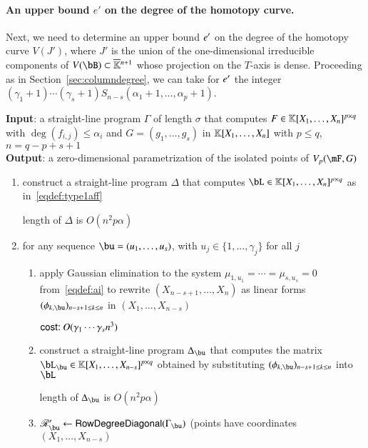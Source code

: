 \documentclass[amsthm]{elsart}
\begin{document}
\paragraph*{An upper bound $e'$ on the degree of the homotopy curve.}
Next, we need to determine an upper bound ${e'}{}$ on the degree of the
homotopy curve $V(J')$, where $J'$ is the union of the one-dimensional
irreducible components of $V(\bB) \subset \KKbar{}^{n+1}$ whose
projection on the $T$-axis is dense. Proceeding as in
Section~\ref{sec:columndegree}, we can take for ${e'}{}$ the integer
$(\gamma_1+1)\cdots(\gamma_s+1) S_{n-s}(\alpha_1
+1,\dots,\alpha_p+1)$.

\medskip



\begin{algorithm}[!t]
\caption{$\mathsf{RowDegree\_simple}(\Gamma)$}
{\bf Input}:  a straight-line program $\Gamma$ of length $\sigma$ that computes
 $F \in \mathbb{K}[X_1, \ldots, X_n]^{p \times q}$ with $\deg(f_{i,j}) \leq \alpha_i$
and $G = (g_1, \ldots, g_s)$ in $\mathbb{K}[X_1, \ldots, X_n]$ with $p \leq q$, $n = q-p+s+1$\\
{\bf Output}: a zero-dimensional parametrization of the isolated points of $\VpFG{p}{\mF}{G}$
\begin{enumerate}
\item construct a straight-line program $\Delta$ that computes
  $\bL \in \KK[X_1,\dots,X_n]^{p \times q}$ as
  in~\eqref{eqdef:type1aff}
  
\hfill length of $\Delta$ is $O(n^2 p \alpha)$
\item for any sequence $\bu=(u_1,\dots,u_s)$, with $u_j \in \{1,\dots,\gamma_j\}$ for all $j$
\begin{enumerate}
\item apply Gaussian elimination to the system 
  $\mu_{1,u_1}=\cdots=\mu_{s,u_s}=0$ from~\eqref{eqdef:ai} to
  rewrite $(X_{n-s+1}, \ldots, X_n)$ as linear forms
  $(\phi_{k,\bu})_{n-s+1 \le k \le n}$ in $(X_1,\dots,X_{n-s})$
  
\hfill  $\text{\sf{cost:~}} O(\gamma_1 \cdots \gamma_s n^3)$

\item construct a straight-line program $\Delta_{\bu}$ that computes the matrix 
  $\bL_\bu  \in \KK[X_1, \dots, X_{n-s}]^{p \times q}$ obtained
  by substituting $(\phi_{k,\bu})_{n-s+1 \le k \le n}$ into $\bL$
  
  \hfill length of $\Delta_{\bu}$ is $O(n^2 p\alpha)$

\item $\scrR'_\bu \gets \mathsf{RowDegreeDiagonal}(\Gamma_\bu)$ (points have coordinates $(X_1,\dots,X_{n-s})$
  

\end{enumerate}
\end{enumerate}
\end{algorithm}
\end{document}

